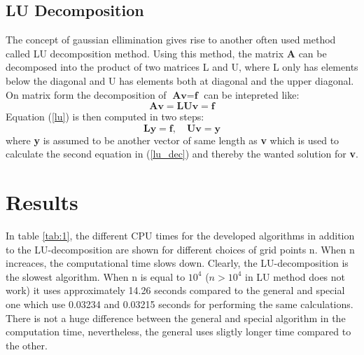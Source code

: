\documentclass{article}
\begin{document}
\subsection{LU Decomposition}
The concept of gaussian ellimination gives rise to another often used method called LU decomposition method. Using this method, the matrix $\textbf{A}$ can be decomposed into the product of two matrices L and U, where L only has elements below the diagonal and U has elements  both at diagonal and the upper diagonal. On matrix form the decomposition of $\textbf{Av} = \textbf{f}$ can be intepreted like:
\begin{equation} 
\label{lu}
 \textbf{Av} = \textbf{LUv} = \textbf{f}
\end{equation}
Equation (\ref{lu}) is then computed in two steps:
\begin{equation}
\label{lu_dec}
\textbf{Ly} = \textbf{f},     \quad  \textbf{Uv} = \textbf{y} 
\end{equation}
where \textbf{y} is assumed to be another vector of same length as \textbf{v} which is used to calculate the second equation in  (\ref{lu_dec}) and thereby the wanted solution for \textbf{v}.

\section{Results}

In  table \ref{tab:1}, the different CPU times for the developed algorithms in addition to the LU-decomposition are shown for different choices of grid points n. When n increaces, the computational time slows down. Clearly, the LU-decomposition is the slowest algorithm. When n is equal to $10^4$ ($n>10^4$ in LU method does not work) it uses approximately 14.26 seconds compared to the general and special one which use 0.03234 and 0.03215 seconds for performing the same calculations. There is not a huge difference between the general and special algorithm in the computation time, nevertheless, the general uses sligtly longer time compared to the other. 
\end{document}
